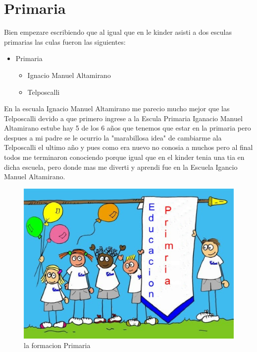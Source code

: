 \chapter{Primaria}
Bien empezare escribiendo que al igual que en le kinder asisti a dos esculas primarias las culas fueron las siguientes:
\begin{itemize}
	\item Primaria
		\begin{itemize}
			\item	Ignacio Manuel Altamirano
			\item	Telposcalli
		\end{itemize}
\end{itemize}

En la escuala Ignacio Manuel Altamirano me parecio mucho mejor que las Telposcalli devido a que primero ingrese a la Escula Primaria Iganacio Manuel Altamirano estube hay 5 de los 6 años que tenemos que estar en la primaria
pero despues a mi padre se le ocurrio la "marabillosa idea" de cambiarme ala Telposcalli el ultimo año y pues como era nuevo no conosia a muchos pero al final todos me terminaron conociendo porque igual que en el kinder tenia una tia en dicha escuela, pero donde mas me diverti y aprendi fue en la Escuela Igancio Manuel Altamirano.

\begin{figure}[H]
\centering
\includegraphics[width=.5\textwidth]{treeChapter/primaria.eps}
\caption{la formacion Primaria}
\label{Primaria}	
\end{figure}
